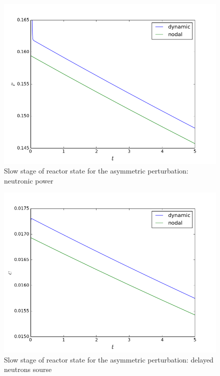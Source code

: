 \documentclass[authoryear]{elsarticle}
\begin{document}
\begin{figure}[!h]
  \begin{center}
    \includegraphics[width=0.9\linewidth] {17.png}
	\caption{Slow stage of reactor state for the asymmetric perturbation: neutronic power}
	\label{fig:17}
  \end{center}
\end{figure} 

\begin{figure}[!h]
  \begin{center}
    \includegraphics[width=0.9\linewidth] {18.png}
	\caption{Slow stage of reactor state for the asymmetric perturbation: delayed neutrons sourse}
	\label{fig:18}
  \end{center}
\end{figure} 

\clearpage
\end{document}
